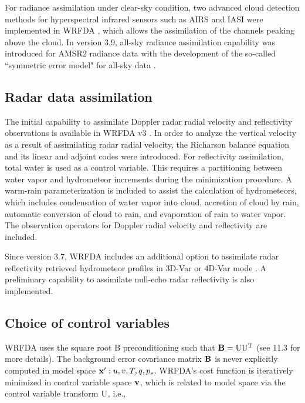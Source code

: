 For radiance assimilation under clear-sky condition, two advanced cloud detection methods for hyperspectral infrared sensors 
such as AIRS and IASI were implemented in WRFDA \citep{xu13, xu14, xu15, auligne14a, auligne14b}, 
which allows the assimilation of the channels peaking above the cloud.
In version 3.9, all-sky radiance assimilation capability was introduced for AMSR2 radiance data \citep{yang16} 
with the development of the so-called ``symmetric error model" for all-sky data \citep{geer11}.

\subsection{Radar data assimilation}

The initial capability to assimilate Doppler radar radial velocity and reflectivity observations is available in WRFDA v3
\citep{xiao05, xiao07, xiao072, xiao08}. In order to analyze the vertical velocity as a result of
assimilating radar radial velocity, the Richarson balance equation
 and its linear and adjoint codes were introduced.
For reflectivity assimilation, total water is used as a control variable. 
This requires a partitioning between water vapor and hydrometeor increments during the minimization procedure.
A warm-rain parameterization is included to assist the calculation of hydrometeors, which includes condensation of water vapor
into cloud, accretion of cloud by rain, automatic conversion of cloud to rain, and evaporation of rain to water vapor.
The observation operators for Doppler radial velocity and reflectivity are included.

Since version 3.7, WRFDA includes an additional option to assimilate radar reflectivity retrieved hydrometeor profiles 
in 3D-Var or 4D-Var mode \citep{wang13a, wang13b, sun13}. A preliminary capability to assimilate 
null-echo radar reflectivity is also implemented.

\subsection{Choice of control variables}
\label{var-cvs}

WRFDA uses the square root B preconditioning such that ${\bf B} = {\rm U} {\rm U^T} $ (see 11.3 for more details). 
The background error covariance matrix ${\bf B}$ is never explicitly computed in model space ${\bf x}': u, v, T, q, p_{s}$.  WRFDA's cost function is iteratively minimized in 
control variable space ${\bf v}$, which is related to model space via the control variable transform ${\rm U}$, 
i.e.,

